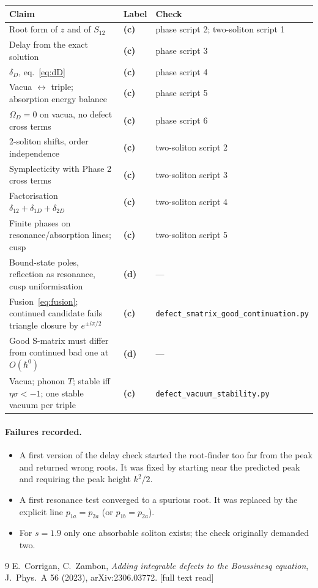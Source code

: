 \documentclass[11pt,a4paper]{article}
\newcommand{\Lc}{\textsf{\textbf{(c)}}}\newcommand{\Ld}{\textsf{\textbf{(d)}}}
\begin{document}
\begin{center}\begin{tabular}{lll}\toprule
Claim & Label & Check\\\midrule
Root form of $z$ and of $S_{12}$ & \Lc & phase script 2; two-soliton script 1\\
Delay from the exact solution & \Lc & phase script 3\\
$\delta_D$, eq.~\eqref{eq:dD} & \Lc & phase script 4\\
Vacua $\leftrightarrow$ triple; absorption energy balance & \Lc & phase script 5\\
$\Omega_D=0$ on vacua, no defect cross terms & \Lc & phase script 6\\
2-soliton shifts, order independence & \Lc & two-soliton script 2\\
Symplecticity with Phase 2 cross terms & \Lc & two-soliton script 3\\
Factorisation $\delta_{12}+\delta_{1D}+\delta_{2D}$ & \Lc & two-soliton script 4\\
Finite phases on resonance/absorption lines; cusp & \Lc & two-soliton script 5\\
Bound-state poles, reflection as resonance, cusp uniformisation & \Ld & ---\\
Fusion~\eqref{eq:fusion}; continued candidate fails triangle closure by $e^{\pm i\pi/2}$ & \Lc & \texttt{defect\_smatrix\_good\_continuation.py}\\
Good S-matrix must differ from continued bad one at $O(\hbar^0)$ & \Ld & ---\\
Vacua; phonon $T$; stable iff $\eta\sigma<-1$; one stable vacuum per triple & \Lc & \texttt{defect\_vacuum\_stability.py}\\\bottomrule
\end{tabular}\end{center}

\paragraph{Failures recorded.}
\begin{itemize}
\item A first version of the delay check started the root-finder too far from the peak and returned wrong roots. It was fixed by starting near the predicted peak and requiring the peak height $k^2/2$.
\item A first resonance test converged to a spurious root. It was replaced by the explicit line $p_{1a}=p_{2a}$ (or $p_{1b}=p_{2a}$).
\item For $s=1.9$ only one absorbable soliton exists; the check originally demanded two.
\end{itemize}

\begin{thebibliography}{9}
 E.~Corrigan, C.~Zambon, \emph{Adding integrable defects to the Boussinesq equation}, J.~Phys.~A 56 (2023), arXiv:2306.03772. [full text read]
\end{thebibliography}
\end{document}
